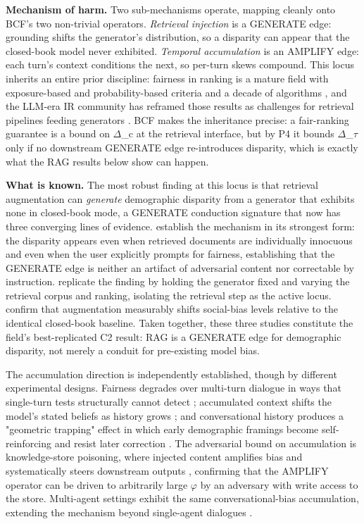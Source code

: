 \documentclass[10pt]{article}
\begin{document}
\textbf{Mechanism of harm.} Two sub-mechanisms operate, mapping cleanly onto BCF's two non-trivial operators. \emph{Retrieval injection} is a GENERATE edge: grounding shifts the generator's distribution, so a disparity can appear that the closed-book model never exhibited. \emph{Temporal accumulation} is an AMPLIFY edge: each turn's context conditions the next, so per-turn skews compound. This locus inherits an entire prior discipline: fairness in ranking is a mature field with exposure-based and probability-based criteria and a decade of algorithms \cite{zehlike2022fairness}, and the LLM-era IR community has reframed those results as challenges for retrieval pipelines feeding generators \cite{dai2024bias,dai2025trustworthy}. BCF makes the inheritance precise: a fair-ranking guarantee is a bound on $\Delta$\_c at the retrieval interface, but by P4 it bounds $\Delta$\_$\tau$ only if no downstream GENERATE edge re-introduces disparity, which is exactly what the RAG results below show can happen.

\textbf{What is known.} The most robust finding at this locus is that retrieval augmentation can \emph{generate} demographic disparity from a generator that exhibits none in closed-book mode, a GENERATE conduction signature that now has three converging lines of evidence. \cite{hu2024free} establish the mechanism in its strongest form: the disparity appears even when retrieved documents are individually innocuous and even when the user explicitly prompts for fairness, establishing that the GENERATE edge is neither an artifact of adversarial content nor correctable by instruction. \cite{wu2024rag} replicate the finding by holding the generator fixed and varying the retrieval corpus and ranking, isolating the retrieval step as the active locus. \cite{zhang2025evaluating} confirm that augmentation measurably shifts social-bias levels relative to the identical closed-book baseline. Taken together, these three studies constitute the field's best-replicated C2 result: RAG is a GENERATE edge for demographic disparity, not merely a conduit for pre-existing model bias.

The accumulation direction is independently established, though by different experimental designs. Fairness degrades over multi-turn dialogue in ways that single-turn tests structurally cannot detect \cite{fan2024fairmt}; accumulated context shifts the model's stated beliefs as history grows \cite{geng2025accumulating}; and conversational history produces a "geometric trapping" effect in which early demographic framings become self-reinforcing and resist later correction \cite{simhi2026old}. The adversarial bound on accumulation is knowledge-store poisoning, where injected content amplifies bias and systematically steers downstream outputs \cite{wang2025bias}, confirming that the AMPLIFY operator can be driven to arbitrarily large $\varphi$ by an adversary with write access to the store. Multi-agent settings exhibit the same conversational-bias accumulation, extending the mechanism beyond single-agent dialogues \cite{coppolillo2025unmasking}.
\end{document}
